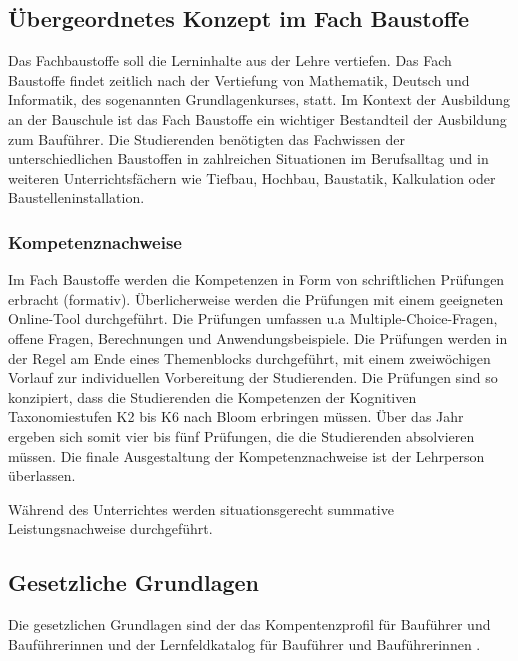 \documentclass[
11pt,
captions=tableheading,
smallheadings,
headsepline,
footsepline, 
captions=tableheading,
parskip=half-,
]{scrartcl}
\begin{document}
\subsection{Übergeordnetes Konzept im Fach Baustoffe}
Das Fachbaustoffe soll die Lerninhalte aus der Lehre vertiefen.
Das Fach Baustoffe findet zeitlich  nach der Vertiefung von Mathematik, Deutsch und Informatik, des sogenannten Grundlagenkurses, statt.
Im Kontext der Ausbildung an der Bauschule ist das Fach Baustoffe ein wichtiger Bestandteil der Ausbildung zum Bauführer.
Die Studierenden benötigten das Fachwissen der unterschiedlichen Baustoffen in zahlreichen Situationen im Berufsalltag und in weiteren Unterrichtsfächern wie Tiefbau, Hochbau, Baustatik, Kalkulation oder Baustelleninstallation.



\subsubsection{Kompetenznachweise}

Im Fach Baustoffe werden die Kompetenzen in Form von schriftlichen Prüfungen erbracht (formativ).
Überlicherweise werden die Prüfungen mit einem geeigneten Online-Tool durchgeführt.
Die Prüfungen umfassen u.a Multiple-Choice-Fragen, offene Fragen, Berechnungen und Anwendungsbeispiele.
Die Prüfungen werden in der Regel am Ende eines Themenblocks durchgeführt, mit einem zweiwöchigen Vorlauf zur individuellen Vorbereitung der Studierenden.
Die Prüfungen sind so konzipiert, dass die Studierenden die Kompetenzen der Kognitiven Taxonomiestufen K2 bis K6 nach Bloom erbringen müssen.
Über das Jahr ergeben sich somit vier bis fünf Prüfungen, die die Studierenden absolvieren müssen.
Die finale Ausgestaltung der Kompetenznachweise ist der Lehrperson überlassen.

Während des Unterrichtes werden situationsgerecht summative Leistungsnachweise durchgeführt.

\subsection{Gesetzliche Grundlagen}
Die gesetzlichen Grundlagen sind der das Kompentenzprofil für Bauführer und Bauführerinnen \cite{Kompetenzprofil_Baufuehrer} und der Lernfeldkatalog für Bauführer und Bauführerinnen \cite{Lernfeldkatalog_Baufuehrer}.
\end{document}
